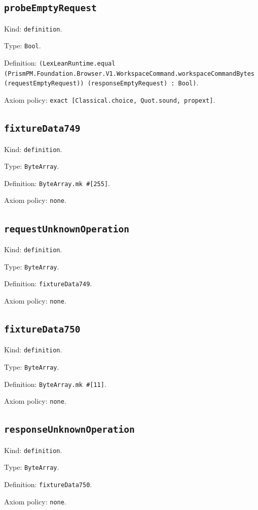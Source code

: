 \documentclass[11pt]{article}
\begin{document}
\subsection*{\texttt{probeEmptyRequest}}
\noindent Kind: \texttt{definition}.\par
\noindent Type: \texttt{Bool}.\par
\noindent Definition: \texttt{(LexLeanRuntime.equal (PrismPM.Foundation.Browser.V1.WorkspaceCommand.workspaceCommandBytes (requestEmptyRequest)) (responseEmptyRequest) : Bool)}.\par
\noindent Axiom policy: \texttt{exact [Classical.choice, Quot.sound, propext]}.\par
\subsection*{\texttt{fixtureData749}}
\noindent Kind: \texttt{definition}.\par
\noindent Type: \texttt{ByteArray}.\par
\noindent Definition: \texttt{ByteArray.mk \#[255]}.\par
\noindent Axiom policy: \texttt{none}.\par
\subsection*{\texttt{requestUnknownOperation}}
\noindent Kind: \texttt{definition}.\par
\noindent Type: \texttt{ByteArray}.\par
\noindent Definition: \texttt{fixtureData749}.\par
\noindent Axiom policy: \texttt{none}.\par
\subsection*{\texttt{fixtureData750}}
\noindent Kind: \texttt{definition}.\par
\noindent Type: \texttt{ByteArray}.\par
\noindent Definition: \texttt{ByteArray.mk \#[11]}.\par
\noindent Axiom policy: \texttt{none}.\par
\subsection*{\texttt{responseUnknownOperation}}
\noindent Kind: \texttt{definition}.\par
\noindent Type: \texttt{ByteArray}.\par
\noindent Definition: \texttt{fixtureData750}.\par
\noindent Axiom policy: \texttt{none}.\par
\end{document}
